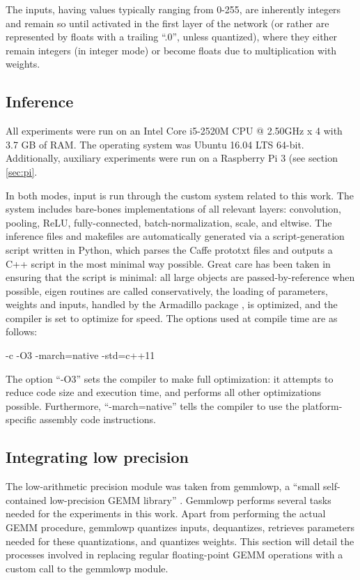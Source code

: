 The inputs, having values typically ranging from 0-255, are inherently integers and remain so until activated in the first layer of the network (or rather are represented by floats with a trailing ``.0'', unless quantized), where they either remain integers (in integer mode) or become floats due to multiplication with weights.

\subsection{Inference}
All experiments were run on an Intel Core i5-2520M CPU @ 2.50GHz x 4 with 3.7 GB of RAM. The operating system was Ubuntu 16.04 LTS 64-bit. Additionally, auxiliary experiments were run on a Raspberry Pi 3 (see section \ref{sec:pi}.

In both modes, input is run through the custom system related to this work. The system includes bare-bones implementations of all relevant layers: convolution, pooling, ReLU, fully-connected, batch-normalization, scale, and eltwise. The inference files and makefiles are automatically generated via a script-generation script written in Python, which parses the Caffe prototxt files and outputs a C++ script in the most minimal way possible. Great care has been taken in ensuring that the script is minimal: all large objects are passed-by-reference when possible, eigen routines are called conservatively, the loading of parameters, weights and inputs, handled by the Armadillo package \cite{eigen_vs_armadillo}, is optimized, and the compiler is set to optimize for speed. The options used at compile time are as follows: 

\lstset{language=make}
-c -O3 -march=native -std=c++11

The option ``-O3'' sets the compiler to make full optimization: it attempts to reduce code size and execution time, and performs all other optimizations possible. Furthermore, ``-march=native'' tells the compiler to use the platform-specific assembly code instructions.

\subsection{Integrating low precision}
The low-arithmetic precision module was taken from gemmlowp, a ``small self-contained low-precision GEMM library'' \cite{gemmlowp}. Gemmlowp performs several tasks needed for the experiments in this work. Apart from performing the actual GEMM procedure, gemmlowp quantizes inputs, dequantizes, retrieves parameters needed for these quantizations, and quantizes weights. This section will detail the processes involved in replacing regular floating-point GEMM operations with a custom call to the gemmlowp module.

